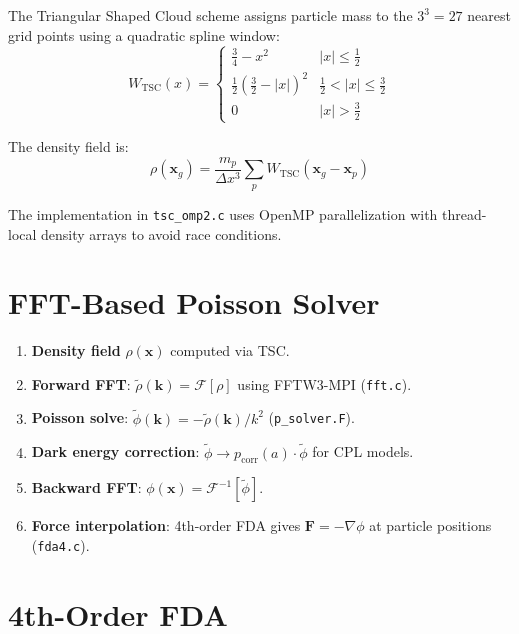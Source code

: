 \documentclass[11pt,fleqn]{book}
\newcommand{\file}[1]{\texttt{#1}}
\begin{document}
The Triangular Shaped Cloud scheme assigns particle mass to the $3^3 = 27$ nearest grid points using a quadratic spline window:
\begin{equation}
  W_\text{TSC}(x) = \begin{cases}
    \frac{3}{4} - x^2 & |x| \leq \frac{1}{2} \\[4pt]
    \frac{1}{2}\left(\frac{3}{2} - |x|\right)^2 & \frac{1}{2} < |x| \leq \frac{3}{2} \\[4pt]
    0 & |x| > \frac{3}{2}
  \end{cases}
\end{equation}

The density field is:
\begin{equation}
  \rho(\mathbf{x}_g) = \frac{m_p}{\Delta x^3}\sum_p W_\text{TSC}(\mathbf{x}_g - \mathbf{x}_p)
\end{equation}

The implementation in \file{tsc\_omp2.c} uses OpenMP parallelization with thread-local density arrays to avoid race conditions.

\section{FFT-Based Poisson Solver}

\begin{algorithm}
\begin{enumerate}[leftmargin=2em]
  \item \textbf{Density field} $\rho(\mathbf{x})$ computed via TSC.
  \item \textbf{Forward FFT}: $\tilde\rho(\mathbf{k}) = \mathcal{F}[\rho]$ using FFTW3-MPI (\file{fft.c}).
  \item \textbf{Poisson solve}: $\tilde\phi(\mathbf{k}) = -\tilde\rho(\mathbf{k})/k^2$ (\file{p\_solver.F}).
  \item \textbf{Dark energy correction}: $\tilde\phi \to p_\text{corr}(a)\cdot\tilde\phi$ for CPL models.
  \item \textbf{Backward FFT}: $\phi(\mathbf{x}) = \mathcal{F}^{-1}[\tilde\phi]$.
  \item \textbf{Force interpolation}: 4th-order FDA gives $\mathbf{F} = -\nabla\phi$ at particle positions (\file{fda4.c}).
\end{enumerate}
\end{algorithm}

\section{4th-Order FDA}
\end{document}
